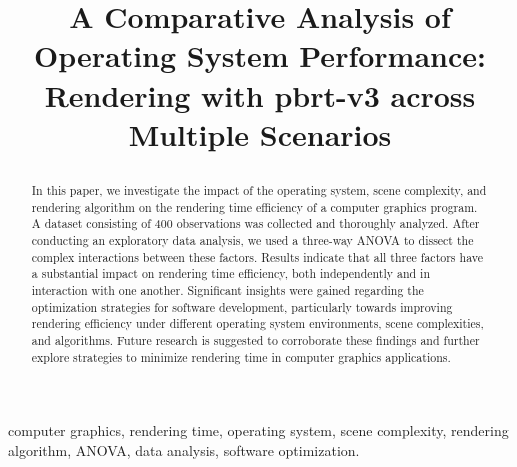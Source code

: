 \documentclass[conference]{IEEEtran}
\begin{document}
\title{A Comparative Analysis of Operating System Performance: Rendering with pbrt-v3 across Multiple Scenarios\\


\author{
}}

\maketitle

\begin{abstract}
In this paper, we investigate the impact of the operating system, scene complexity, and rendering algorithm on the rendering time efficiency of a computer graphics program. A dataset consisting of 400 observations was collected and thoroughly analyzed. After conducting an exploratory data analysis, we used a three-way ANOVA to dissect the complex interactions between these factors. Results indicate that all three factors have a substantial impact on rendering time efficiency, both independently and in interaction with one another. Significant insights were gained regarding the optimization strategies for software development, particularly towards improving rendering efficiency under different operating system environments, scene complexities, and algorithms. Future research is suggested to corroborate these findings and further explore strategies to minimize rendering time in computer graphics applications.
\end{abstract}

\begin{IEEEkeywords}
computer graphics, rendering time, operating system, scene complexity, rendering algorithm, ANOVA, data analysis, software optimization.
\end{IEEEkeywords}

\end{document}
